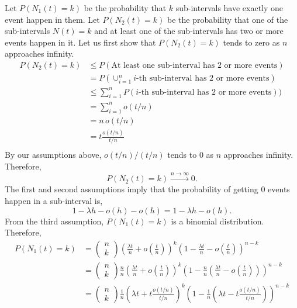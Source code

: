\documentclass{article}
\begin{document}
Let $P(N_1(t) = k)$ be the probability that $k$ sub-intervals have exactly one event happen in them. Let $P(N_2(t) = k)$ be the probability that one of the sub-intervals $N(t) = k$ and at least one of the sub-intervals has two or more events happen in it. Let us first show that $P(N_2(t) = k)$ tends to zero as $n$ approaches infinity.
\begin{align*}
    P(N_2(t) = k) & \leq P(\text{At least one sub-interval has 2 or more events}) \\
    & = P(\cup_{i=1}^{n} \text{$i$-th sub-interval has 2 or more events}) \\
    & \leq \sum_{i=1}^{n} P(\text{$i$-th sub-interval has 2 or more events})) \\
    & = \sum_{i=1}^{n} o(t / n) \\
    & = n \, o(t / n) \\
    & = t \frac{o(t / n)}{t / n} \\
\end{align*}
By our assumptions above, $o(t / n) / (t / n)$ tends to $0$ as $n$ approaches infinity. Therefore,
\begin{equation*}
    P(N_2(t) = k) \xrightarrow{n \rightarrow{} \infty} 0.
\end{equation*}
The first and second assumptions imply that the probability of getting $0$ events happen in a sub-interval is,
\begin{equation*}
    1 - \lambda h - o(h) - o(h) = 1 - \lambda h - o(h).
\end{equation*}
From the third assumption, $P(N_1(t) = k)$ is a binomial distribution. Therefore,
\begin{align*}
    P(N_1(t) = k) & =
    \begin{pmatrix} n \\ k \end{pmatrix}
    \left( \frac{\lambda t}{n} + o\left( \frac{t}{n} \right) \right) ^ k
    \left( 1 - \frac{\lambda t}{n} - o\left(\frac{t}{n}\right) \right) ^ {n - k} \\
    & =
    \begin{pmatrix} n \\ k \end{pmatrix}
    \frac{n}{n} \left( \frac{\lambda t}{n} + o\left( \frac{t}{n} \right) \right) ^ k
    \left( 1 - \frac{n}{n} (\frac{\lambda t}{n} - o\left(\frac{t}{n}\right))\right) ^ {n - k} \\
    & =
    \begin{pmatrix} n \\ k \end{pmatrix}
    \frac{1}{n} \left( \lambda t + t \frac{o(t / n)}{t / n} \right) ^ k
    \left( 1 - \frac{1}{n} (\lambda t - t\frac{o(t / n)}{t / n} ) \right) ^ {n - k} \\
\end{align*}
\end{document}

